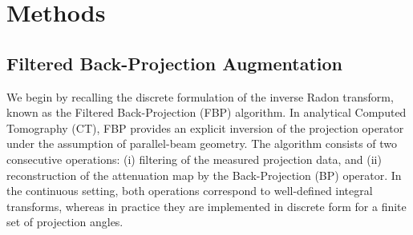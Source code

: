 %
%	
%	
%	
%	


\section{Methods}

\subsection{Filtered Back-Projection Augmentation}


We begin by recalling the discrete formulation of the inverse Radon transform, known as the Filtered Back-Projection (FBP) algorithm. In analytical Computed Tomography (CT), FBP provides an explicit inversion of the projection operator under the assumption of parallel-beam geometry. The algorithm consists of two consecutive operations: (i) filtering of the measured projection data, and (ii) reconstruction of the attenuation map by the Back-Projection (BP) operator. In the continuous setting, both operations correspond to well-defined integral transforms, whereas in practice they are implemented in discrete form for a finite set of projection angles.

